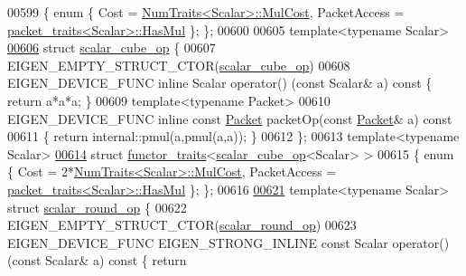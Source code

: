 \begin{DoxyCode}
00599 \{ \textcolor{keyword}{enum} \{ Cost = \hyperlink{group___core___module_struct_eigen_1_1_num_traits}{NumTraits<Scalar>::MulCost}, PacketAccess = 
      \hyperlink{struct_eigen_1_1internal_1_1packet__traits}{packet\_traits<Scalar>::HasMul} \}; \};
00600 
00605 \textcolor{keyword}{template}<\textcolor{keyword}{typename} Scalar>
\hyperlink{struct_eigen_1_1internal_1_1scalar__cube__op}{00606} \textcolor{keyword}{struct }\hyperlink{struct_eigen_1_1internal_1_1scalar__cube__op}{scalar\_cube\_op} \{
00607   EIGEN\_EMPTY\_STRUCT\_CTOR(\hyperlink{struct_eigen_1_1internal_1_1scalar__cube__op}{scalar\_cube\_op})
00608   EIGEN\_DEVICE\_FUNC \textcolor{keyword}{inline} Scalar operator() (\textcolor{keyword}{const} Scalar& a)\textcolor{keyword}{ const }\{ \textcolor{keywordflow}{return} a*a*a; \}
00609   \textcolor{keyword}{template}<\textcolor{keyword}{typename} Packet>
00610   EIGEN\_DEVICE\_FUNC \textcolor{keyword}{inline} \textcolor{keyword}{const} \hyperlink{union_eigen_1_1internal_1_1_packet}{Packet} packetOp(\textcolor{keyword}{const} \hyperlink{union_eigen_1_1internal_1_1_packet}{Packet}& a)\textcolor{keyword}{ const}
00611 \textcolor{keyword}{  }\{ \textcolor{keywordflow}{return} internal::pmul(a,pmul(a,a)); \}
00612 \};
00613 \textcolor{keyword}{template}<\textcolor{keyword}{typename} Scalar>
\hyperlink{struct_eigen_1_1internal_1_1functor__traits_3_01scalar__cube__op_3_01_scalar_01_4_01_4}{00614} \textcolor{keyword}{struct }\hyperlink{struct_eigen_1_1internal_1_1functor__traits}{functor\_traits}<\hyperlink{struct_eigen_1_1internal_1_1scalar__cube__op}{scalar\_cube\_op}<Scalar> >
00615 \{ \textcolor{keyword}{enum} \{ Cost = 2*\hyperlink{group___core___module_struct_eigen_1_1_num_traits}{NumTraits<Scalar>::MulCost}, PacketAccess = 
      \hyperlink{struct_eigen_1_1internal_1_1packet__traits}{packet\_traits<Scalar>::HasMul} \}; \};
00616 
\hyperlink{struct_eigen_1_1internal_1_1scalar__round__op}{00621} \textcolor{keyword}{template}<\textcolor{keyword}{typename} Scalar> \textcolor{keyword}{struct }\hyperlink{struct_eigen_1_1internal_1_1scalar__round__op}{scalar\_round\_op} \{
00622   EIGEN\_EMPTY\_STRUCT\_CTOR(\hyperlink{struct_eigen_1_1internal_1_1scalar__round__op}{scalar\_round\_op})
00623   EIGEN\_DEVICE\_FUNC EIGEN\_STRONG\_INLINE \textcolor{keyword}{const} Scalar operator() (\textcolor{keyword}{const} Scalar& a)\textcolor{keyword}{ const }\{ \textcolor{keywordflow}{return} 

\end{DoxyCode}
